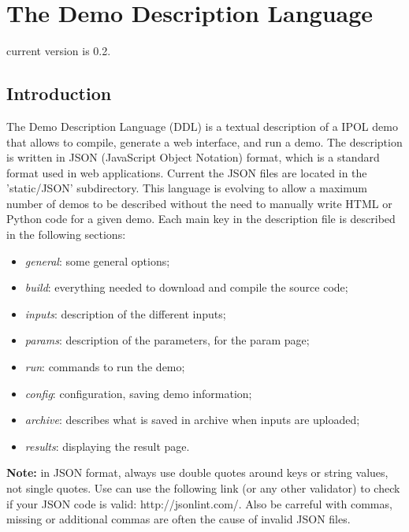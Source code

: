 \section{The Demo Description Language}

current version is 0.2.

\subsection{Introduction}
The Demo Description Language (DDL) is a textual description of a IPOL demo that 
allows to compile, generate a web interface, and run a demo. The description is 
written in JSON (JavaScript Object Notation) format, which is a standard format 
used in web applications. Current the JSON files are located in the 'static/JSON'
subdirectory. This language is evolving to allow a maximum number 
of demos to be described without the need to manually write HTML or Python code 
for a given demo. Each main key in the description file is described in the 
following sections:
\begin{itemize}
  \item \textit{general}: some general options;
  \item \textit{build}: everything needed to download and compile the source code;
  \item \textit{inputs}: description of the different inputs;
  \item \textit{params}: description of the parameters, for the param page;
  \item \textit{run}: commands to run the demo;
  \item \textit{config}: configuration, saving demo information;
  \item \textit{archive}: describes what is saved in archive when inputs are uploaded;
  \item \textit{results}: displaying the result page.
\end{itemize}



{\bf Note:} in JSON format, always use double quotes around keys or string 
values, not single quotes. Use can use the following link (or any other validator)
to check if your JSON code is valid: http://jsonlint.com/.
Also be carreful with commas, missing or additional commas are often the cause of
invalid JSON files.

